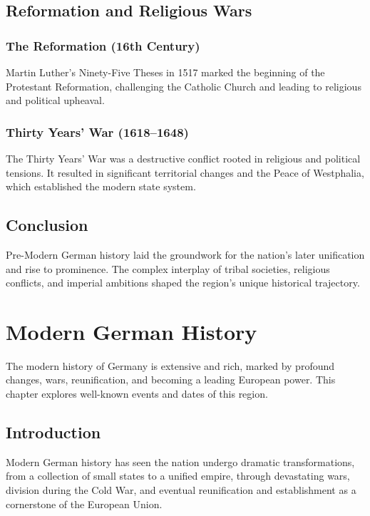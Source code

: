 \documentclass{book}
\begin{document}
\section{Reformation and Religious Wars}
\label{sec:reformation-religious-wars}
\subsection{The Reformation (16th Century)}
Martin Luther’s Ninety-Five Theses in 1517 marked the beginning of the Protestant Reformation, challenging the Catholic Church and leading to religious and political upheaval.

\subsection{Thirty Years’ War (1618–1648)}
The Thirty Years’ War was a destructive conflict rooted in religious and political tensions. It resulted in significant territorial changes and the Peace of Westphalia, which established the modern state system.

\section{Conclusion}
\label{sec:conclusion-pre-modern-germany}
Pre-Modern German history laid the groundwork for the nation’s later unification and rise to prominence. The complex interplay of tribal societies, religious conflicts, and imperial ambitions shaped the region’s unique historical trajectory.

\chapter{Modern German History}
\label{ch:modern-german-history}

The modern history of Germany is extensive and rich, marked by profound changes, wars, reunification, and becoming a leading European power. This chapter explores well-known events and dates of this region.

\section{Introduction}
\label{sec:introduction-modern-germany}
Modern German history has seen the nation undergo dramatic transformations, from a collection of small states to a unified empire, through devastating wars, division during the Cold War, and eventual reunification and establishment as a cornerstone of the European Union.
\end{document}
